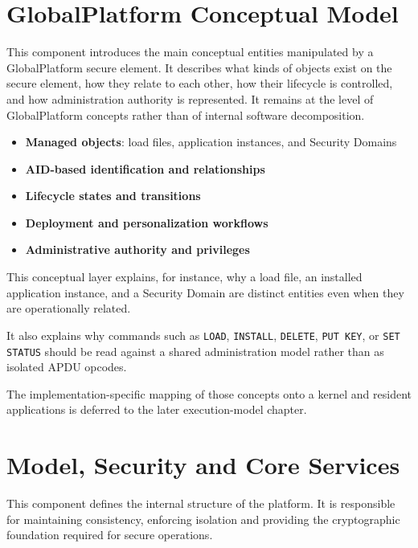 \section{GlobalPlatform Conceptual Model}

This component introduces the main conceptual entities manipulated by a
GlobalPlatform secure element. It describes what kinds of objects exist on the
secure element, how they relate to each other, how their lifecycle is controlled,
and how administration authority is represented. It remains at the level
of GlobalPlatform concepts rather than of internal software
decomposition.

\begin{itemize}
\item \textbf{Managed objects}: load files, application instances, and Security
  Domains 
\item \textbf{AID-based identification and relationships}
\item \textbf{Lifecycle states and transitions}
\item \textbf{Deployment and personalization workflows}
\item \textbf{Administrative authority and privileges}
\end{itemize}

This conceptual layer explains, for instance, why a load file, an
installed application instance, and a Security Domain are distinct
entities even when they are operationally related.

It also explains why commands such as \texttt{LOAD}, \texttt{INSTALL},
\texttt{DELETE}, \texttt{PUT KEY}, or \texttt{SET STATUS} should be read
against a shared administration model rather than as isolated APDU
opcodes.

The implementation-specific mapping of those concepts onto a kernel and
resident applications is deferred to the later execution-model chapter.

\section{Model, Security and Core Services}

This component defines the internal structure of the platform. It is
responsible for maintaining consistency, enforcing isolation and providing the
cryptographic foundation required for secure operations.

